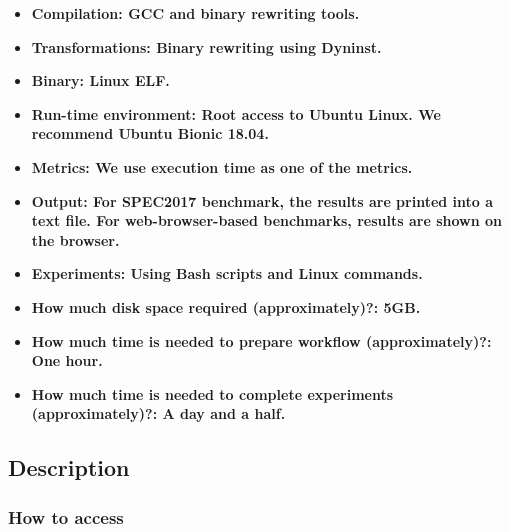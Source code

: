 \documentclass{sigplanconf}
\begin{document}
{\small
\begin{itemize}
  \item {\bf Compilation: GCC and binary rewriting tools.}
  \item {\bf Transformations: Binary rewriting using Dyninst.}
  \item {\bf Binary: Linux ELF.}
  \item {\bf Run-time environment: Root access to Ubuntu Linux. We recommend Ubuntu Bionic 18.04.}
  \item {\bf Metrics: We use execution time as one of the metrics.}
  \item {\bf Output: For SPEC2017 benchmark, the results are printed into a text file. For web-browser-based benchmarks, results are shown on the browser.}
  \item {\bf Experiments: Using Bash scripts and Linux commands.}
  \item {\bf How much disk space required (approximately)?: 5GB.}
  \item {\bf How much time is needed to prepare workflow (approximately)?: One hour.}
  \item {\bf How much time is needed to complete experiments (approximately)?: A day and a half.}
\end{itemize}

\subsection{Description}

\subsubsection{How to access}

}
\end{document}
